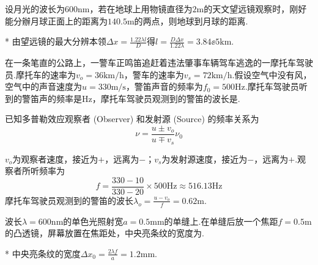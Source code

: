 \begin{problem}[最大分辨本领]
    设月光的波长为$600\mathrm{nm}$，若在地球上用物镜直径为$2\mathrm{m}$的天文望远镜观察时，刚好能分辦月球正面上的距离为$140.5\mathrm{m}$的两点，则地球到月球的距离.
\end{problem}
\begin{solution}*
    由望远镜的最大分辨本领$\Delta x=\frac{1.22\lambda l}{D}$得$l=\frac{D\Delta x}{1.22\lambda}=3.84\ee5\mathrm{km}$.
\end{solution}

\begin{problem}[多普勒效应]
    在一条笔直的公路上，一警车正鸣笛追赶着违法肇事车辆驾车逃逸的一摩托车驾驶员.摩托车的速率为$v_o=36\mathrm{km/h}$，警车的速率为$v_s=72\mathrm{km/h}$.假设空气中没有风，空气中的声音速度为$u=330\mathrm{m/s}$，警笛声音的频率为$f_0=500\mathrm{Hz}$.摩托车驾驶员听到的警笛声的频率是$\mathrm{Hz}$，摩托车驾驶员观测到的警笛的波长是.
\end{problem}
\begin{solution}
    已知多普勒效应观察者 (Observer) 和发射源 (Source) 的频率关系为
    \[\nu=\frac{u\pm v_o}{u\mp v_s}\nu_0\]

    $v_o$为观察者速度，接近为$+$，远离为$-$；$v_s$为发射源速度，接近为$-$，远离为$+$.观察者所听频率为
    \[f=\frac{330-10}{330-20}\times 500\mathrm{Hz}\approx 516.13\mathrm{Hz}\]
    摩托车驾驶员观测到的警笛的波长$\lambda_o=\frac{u-v_o}{f}=0.62\mathrm{m}$.
\end{solution}

\begin{problem}[弗琅禾费衍射]
    波长$\lambda=600\mathrm{nm}$的单色光照射宽$a=0.5\mathrm{mm}$的单缝上.在单缝后放一个焦距$f=0.5\mathrm{m}$的凸透镜，屏幕放置在焦距处，中央亮条纹的宽度为.
\end{problem}
\begin{solution}*
    中央亮条纹的宽度$\Delta x_0=\frac{2\lambda f}{a}=1.2\mathrm{mm}$.
\end{solution}

